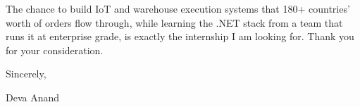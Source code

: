 \documentclass[letterpaper,11pt]{article}
\begin{document}
The chance to build IoT and warehouse execution systems that 180+ countries' worth of orders flow through, while learning the .NET stack from a team that runs it at enterprise grade, is exactly the internship I am looking for. Thank you for your consideration.

Sincerely,

Deva Anand
\end{document}
